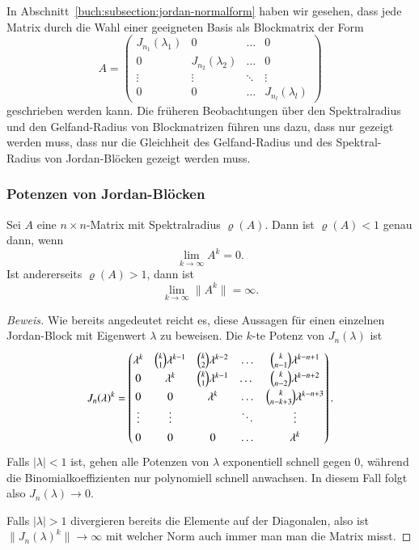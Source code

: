 In Abschnitt~\ref{buch:subsection:jordan-normalform}
haben wir gesehen, dass jede Matrix durch die Wahl
%
einer geeigneten Basis als Blockmatrix der Form
\[
A
=
\begin{pmatrix}
J_{n_1}(\lambda_1) &        0         & \dots & 0 \\
       0         & J_{n_2}(\lambda_2) & \dots & 0 \\[-4pt]
\vdots           &\vdots            &\ddots &\vdots \\
       0         &        0         & \dots &J_{n_l}(\lambda_l)
\end{pmatrix}
\]
geschrieben werden kann.
Die früheren Beobachtungen über den Spektralradius und den
Gelfand-Radius von Blockmatrizen führen uns dazu, dass
nur gezeigt werden muss, dass nur die Gleichheit des Gelfand-Radius
und des Spektral-Radius von Jordan-Blöcken gezeigt werden muss.

\subsubsection{Potenzen von Jordan-Blöcken}
\begin{satz}
\label{buch:spektralradius:satz:grenzwert}
Sei $A$ eine $n\times n$-Matrix mit Spektralradius $\varrho(A)$.
Dann ist $\varrho(A)<1$ genau dann, wenn
\[
\lim_{k\to\infty} A^k = 0.
\]
Ist andererseits $\varrho(A) > 1$, dann ist
\[
\lim_{k\to\infty} \|A^k\|=\infty.
\]
\end{satz}

\begin{proof}[Beweis]
Wie bereits angedeutet reicht es, diese Aussagen für einen einzelnen
Jordan-Block mit Eigenwert $\lambda$ zu beweisen.
Die $k$-te Potenz von $J_n(\lambda)$ ist
\[
J_n(\lambda)^k
=
\renewcommand\arraystretch{1.35}
\begin{pmatrix}
\lambda^k    & \binom{k}{1} \lambda^{k-1} & \binom{k}{2}\lambda^{k-2}&\dots&
\binom{k}{n-1}\lambda^{k-n+1}\\
      0      &\lambda^k & \binom{k}{1} \lambda^{k-1} & \dots &\binom{k}{n-2}\lambda^{k-n+2}\\
      0     &      0    & \lambda^k & \dots &\binom{k}{n-k+3}\lambda^{k-n+3}\\
\vdots      & \vdots    &               &\ddots & \vdots\\
     0      &      0    &      0        &\dots  &\lambda^k
\end{pmatrix}.
\]
Falls $|\lambda| < 1$ ist, gehen alle Potenzen von $\lambda$ exponentiell
schnell gegen $0$, während die Binomialkoeffizienten nur polynomiell
schnell anwachsen. 
%
In diesem Fall folgt also $J_n(\lambda)\to 0$.

Falls $|\lambda| >1$ divergieren bereits die Elemente auf der Diagonalen,
also ist $\|J_n(\lambda)^k\|\to\infty$ mit welcher Norm auch immer man
man die Matrix misst.
\end{proof}

